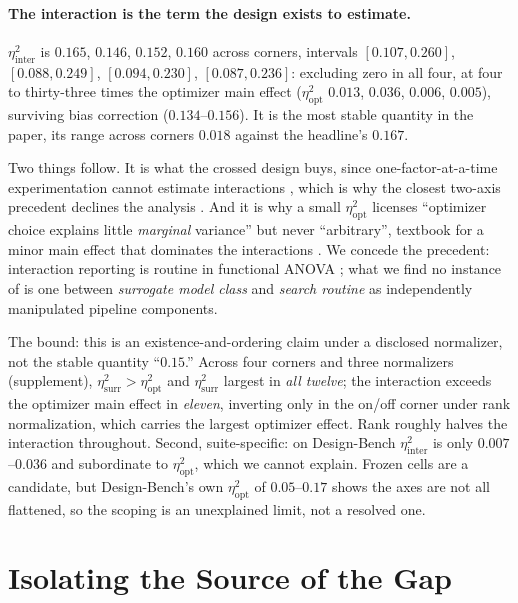 \documentclass[letterpaper]{article} %
\theoremstyle{plain}
\newcommand{\mdemph}[1]{\emph{#1}}
\begin{document}
\paragraph{The interaction is the term the design exists to estimate.} $\eta^2_{\text{inter}}$ is $0.165$, $0.146$, $0.152$, $0.160$ across corners, intervals $[0.107,0.260]$, $[0.088,0.249]$, $[0.094,0.230]$, $[0.087,0.236]$: excluding zero in all four, at four to thirty-three times the optimizer main effect ($\eta^2_{\text{opt}}$ $0.013$, $0.036$, $0.006$, $0.005$), surviving bias correction ($0.134$--$0.156$). It is the most stable quantity in the paper, its range across corners $0.018$ against the headline's $0.167$.

Two things follow. It is what the crossed design buys, since one-factor-at-a-time experimentation cannot estimate interactions \citep{nist2012handbook,box1978statistics}, which is why the closest two-axis precedent declines the analysis \citep{moosbauer2022benchmarkdriven}. And it is why a small $\eta^2_{\text{opt}}$ licenses ``optimizer choice explains little \mdemph{marginal} variance'' but never ``arbitrary'', textbook for a minor main effect that dominates the interactions \citep{nist2012handbook}. We concede the precedent: interaction reporting is routine in functional ANOVA \citep{hutter2014fanova}; what we find no instance of is one between \mdemph{surrogate model class} and \mdemph{search routine} as independently manipulated pipeline components.

The bound: this is an existence-and-ordering claim under a disclosed normalizer, not the stable quantity ``$0.15$.'' Across four corners and three normalizers (supplement), $\eta^2_{\text{surr}}>\eta^2_{\text{opt}}$ and $\eta^2_{\text{surr}}$ largest in \mdemph{all twelve}; the interaction exceeds the optimizer main effect in \mdemph{eleven}, inverting only in the on/off corner under rank normalization, which carries the largest optimizer effect. Rank roughly halves the interaction throughout. Second, suite-specific: on Design-Bench $\eta^2_{\text{inter}}$ is only $0.007$--$0.036$ and subordinate to $\eta^2_{\text{opt}}$, which we cannot explain. Frozen cells are a candidate, but Design-Bench's own $\eta^2_{\text{opt}}$ of $0.05$--$0.17$ shows the axes are not all flattened, so the scoping is an unexplained limit, not a resolved one.

\section{Isolating the Source of the Gap}
\label{sec:mech}
\end{document}
